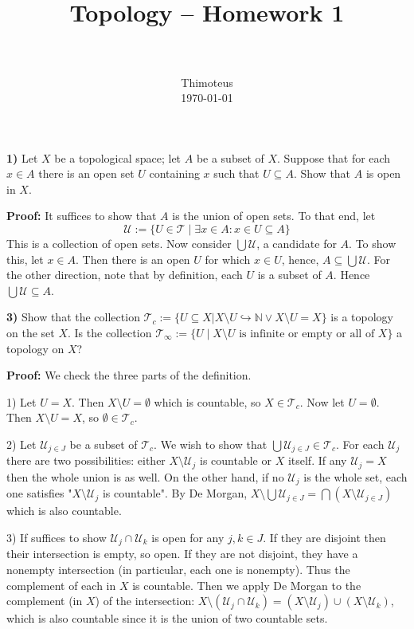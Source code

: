 \documentclass[paper=a4, fontsize=11pt]{scrartcl} %
\title{
    \usefont{OT1}{bch}{b}{n}
    \horrule{0.5pt} \\[0.4cm]
    \huge Topology -- Homework 1 \\
    \horrule{2pt} \\[0.5cm]
}
\author{
    \normalfont                 \normalsize
        Thimoteus\\[-3pt]    \normalsize
        \today
}
\date{}
\newcommand{\script}{\mathcal}
\numberwithin{equation}{section}    %
\numberwithin{figure}{section}      %
\numberwithin{table}{section}       %
\begin{document}
\maketitle


\textbf{1)} Let $X$ be a topological space; let $A$ be a subset of $X$. Suppose
that for each $x \in A$ there is an open set $U$ containing $x$ such that
$U \subseteq A$. Show that $A$ is open in $X$.

\textbf{Proof:} It suffices to show that $A$ is the union of open sets.
To that end, let \[ \script U := \{ U \in \script{T} \mid \exists x \in A : x \in U \subseteq A \}\]
This is a collection of open sets. Now consider $\bigcup{\script U}$, a candidate
for $A$. To show this, let $x \in A$. Then there is an open $U$ for which $x \in U$,
hence, $A \subseteq \bigcup{\script U}$. For the other direction, note that by
definition, each $U$ is a subset of $A$. Hence $\bigcup{\script U} \subseteq A$.

\hrulefill

\textbf {3)} Show that the collection
$\script T_c := \{ U \subseteq X | X\setminus U \hookrightarrow \mathbb N \lor X\setminus U = X \}$
is a topology on the set $X$.
Is the collection $\script T_{\infty} := \{ U \mid X \setminus U \text{ is infinite or empty or all of } X \}$ a topology on $X$?

\textbf {Proof:} We check the three parts of the definition.

1) Let $U = X$. Then
$X\setminus U = \emptyset$ which is countable, so $X \in \script T_c$. Now let
$U = \emptyset$. Then $X \setminus U = X$, so $\emptyset \in \script T_c$.

2) Let $\script U_{j \in J}$ be a subset of $\script T_c$. We wish to show that
$\bigcup \script U_{j \in J} \in \script T_c$. For each $\script U_j$ there are
two possibilities: either $X \setminus \script U_j$ is countable or $X$ itself. If any
$\script U_j = X$ then the whole union is as well. On the other hand, if no
$\script U_j$ is the whole set, each one satisfies "$X \setminus \script U_j$ is
countable". By De Morgan, $X \setminus \bigcup \script U_{j \in J} = 
\bigcap (X \setminus \script U_{j \in J})$ which is also countable.

3) If suffices to show $\script U_j \cap \script U_k$ is open for any $j, k \in J$.
If they are disjoint then their intersection is empty, so open. If they are not
disjoint, they have a nonempty intersection (in particular, each one is nonempty).
Thus the complement of each in $X$ is countable. Then we apply De Morgan to the
complement (in $X$) of the intersection: $X \setminus (\script U_j \cap \script U_k)
= (X \setminus \script U_j) \cup (X \setminus \script U_k)$, which is also countable
since it is the union of two countable sets.
\end{document}
